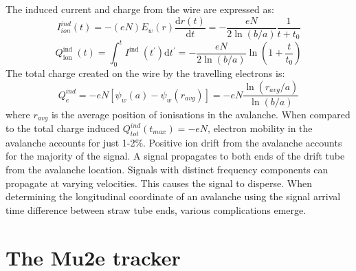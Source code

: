 The induced current and charge from the wire are expressed as:
 \begin{equation}
    I_{i o n}^{i n d}(t)=-(e N) E_w(r) \frac{\mathrm{d} r(t)}{\mathrm{d} t}=-\frac{e N}{2 \ln (b / a)} \frac{1}{t+t_0}
    \end{equation}
    \begin{equation}
        Q_{\text {ion }}^{\text {ind }}(t)=\int_0^t I^{\text {ind }}\left(t^{\prime}\right) \mathrm{d} t^{\prime}=-\frac{e N}{2 \ln (b / a)} \ln \left(1+\frac{t}{t_0}\right)
        \end{equation}
The total charge created on the wire by the travelling electrons is:
\begin{equation}
    Q_e^{i n d}=-e N\left[\psi_w(a)-\psi_w\left(r_{a v g}\right)\right]=-e N \frac{\ln \left(r_{a v g} / a\right)}{\ln (b / a)}
    \end{equation}
    where $r_{avg}$ is the average position of ionisations in the avalanche. When compared to the total charge 
    induced $Q^{ind}_{tot}(t_{max}) = -eN$, electron mobility in the avalanche accounts for just 1-2\%. 
    Positive ion drift from the avalanche accounts for the majority of the signal. A signal propagates 
    to both ends of the drift tube from the avalanche location.
    Signals with distinct frequency components can propagate at varying velocities. This causes the signal to disperse.
    When determining the longitudinal coordinate of an avalanche using the signal arrival time difference between straw tube ends, various complications emerge.
\section{The Mu2e tracker}
